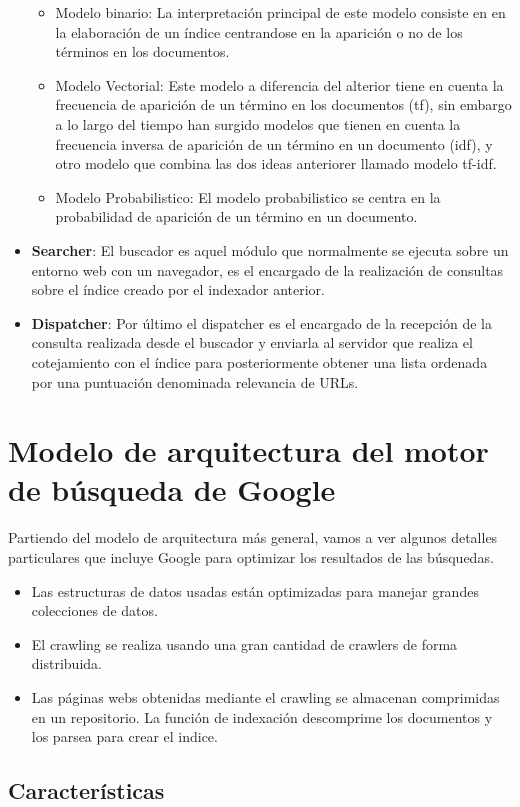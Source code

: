 \documentclass[a4paper, 11pt]{article} %
\begin{document}
\begin{itemize}
				\begin{itemize}
					\item Modelo binario: La interpretación principal de este modelo consiste en en la elaboración de un índice centrandose en la aparición o no de los términos en los documentos.
					\item Modelo Vectorial: Este modelo a diferencia del alterior tiene en cuenta la frecuencia de aparición de un término en los documentos (tf), sin embargo a lo largo del tiempo han surgido modelos que tienen en cuenta la frecuencia inversa de aparición de un término en un documento (idf), y otro modelo que combina las dos ideas anteriorer llamado modelo tf-idf.
					\item Modelo Probabilistico: El modelo probabilistico se centra en la probabilidad de aparición de un término en un documento.
				\end{itemize}
			\item \textbf{Searcher}: El buscador es aquel módulo que normalmente se ejecuta sobre un entorno web con un navegador, es el encargado de la realización de consultas sobre el índice creado por el indexador anterior.
			\item \textbf{Dispatcher}: Por último el dispatcher es el encargado de la recepción de la consulta realizada desde el buscador y enviarla al servidor que realiza el cotejamiento con el índice para posteriormente obtener una lista ordenada por una puntuación denominada relevancia de URLs.
		\end{itemize}
	\section{Modelo de arquitectura del motor de búsqueda de Google}
		Partiendo del modelo de arquitectura más general, vamos a ver algunos detalles particulares que incluye Google para optimizar los resultados de las búsquedas.
		\begin{itemize}
			\item Las estructuras de datos usadas están optimizadas para manejar grandes colecciones de datos.
			\item El crawling se realiza usando una gran cantidad de crawlers de forma distribuida.
			\item Las páginas webs obtenidas mediante el crawling se almacenan comprimidas en un repositorio. La función de indexación descomprime los documentos y los parsea para crear el indice.
		\end{itemize}
		\subsection{Características}
\end{document}
